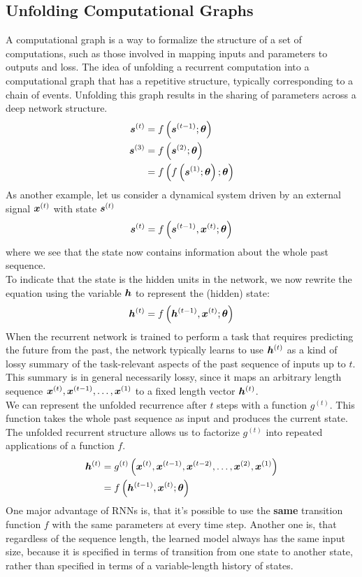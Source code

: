 \begin{multicols}{2}
	\subsection{Unfolding Computational Graphs}
	A computational graph is a way to formalize the structure of a set of computations, such as those involved in mapping inputs and parameters to outputs and loss.
	The idea of unfolding a recurrent computation into a computational graph that has a repetitive structure, typically corresponding to a chain of events.
	Unfolding this graph results in the sharing of parameters across a deep network structure.
	\begin{align*}
	\vs^{(t)} &= f\left(\vs^{(t-1)};\bolt\right)\\
	\vs^{(3)} &= f\left(\vs^{(2)};\bolt\right)\\
	&= f\left(f\left(\vs^{(1)};\bolt\right);\bolt\right)
	\end{align*}
	As another example, let us consider a dynamical system driven by an external signal ${\bm{x}}^{(t)}$ with state ${\bm{s}}^{(t)}$
	\[ \vs^{(t)} = f\left(\vs^{(t-1)},\vx^{(t)};\bolt\right) \]
	where we see that the state now contains information about the whole past sequence.\\

	To indicate that the state is the hidden units in the network, we now rewrite the equation using the variable ${\bm{h}}$ to represent the (hidden) state:
	\[ \vh^{(t)} = f\left(\vh^{(t-1)},\vx^{(t)};\bolt\right) \]
	When the recurrent network is trained to perform a task that requires predicting the future from the past, the network typically learns to use ${\bm{h}}^{(t)}$ as a kind of lossy summary of the task-relevant aspects of the past sequence of inputs up to $t$.
	This summary is in general necessarily lossy, since it maps an arbitrary length sequence ${\bm{x}}^{(t)},{\bm{x}}^{(t-1)},\dots,{\bm{x}}^{(1)}$ to a fixed length vector ${\bm{h}}^{(t)}$.\\

	We can represent the unfolded recurrence after $t$ steps with a function $g^{(t)}$. This function takes the whole past sequence as input and produces the current state.
	The unfolded recurrent structure allows us to factorize $g^{(t)}$ into repeated applications of a function $f$.
	\begin{align*}
	\vh^{(t)} &= g^{(t)}\left( \vx^{(t)},\vx^{(t-1)},\vx^{(t-2)},\dots,\vx^{(2)},\vx^{(1)} \right)\\
	&= f\left(\vh^{(t-1)},\vx^{(t)};\bolt\right)
	\end{align*}
	One major advantage of RNNs is, that it's possible to use the \textbf{same} transition function $f$ with the same parameters at every time step.
	Another one is, that regardless of the sequence length, the learned model always has the same input size, because it is specified in terms of transition from one state to another state, rather than specified in terms of a variable-length history of states.


\end{multicols}
